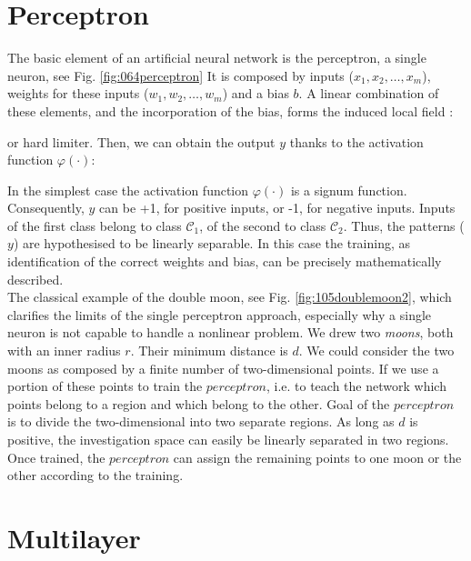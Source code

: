 \section{Perceptron}
\label{sec:perceptron}

The basic element of an artificial neural network is the perceptron, a single
neuron, see Fig.
\ref{fig:064perceptron}
It is composed by inputs ($x_1, x_2, \ldots, x_m$), weights for these inputs
($w_1, w_2, \ldots, w_m$) and a bias $b$.
A linear combination of these elements, and the incorporation of the bias, 
forms the induced local field \cite{RefWorks:158}: 

or hard limiter.
Then, we can obtain the output $y$ thanks to the activation function
$\varphi(\cdot)$:


In the simplest case the activation function $\varphi(\cdot)$ is a signum function.
Consequently, $y$ can be +1, for positive inputs, or -1, for negative inputs. Inputs of the first class
belong to class $\mathscr{C}_1$, of the second to class $\mathscr{C}_2$.
Thus, the patterns ($y$) are hypothesised to be linearly separable.
In this case the training, as identification of the correct weights and bias,
can be precisely mathematically described. \\

The classical example of the double moon, see Fig. \ref{fig:105doublemoon2},
which clarifies the limits of the single perceptron approach, especially 
why a single neuron is not capable to handle a
nonlinear problem.
We drew two \textit{moons}, both with an inner radius $r$. 
Their minimum distance is $d$.
We could consider the two moons as composed by a finite number of
two-dimensional points.
If we use a portion of these points to train the $perceptron$, i.e. 
to teach the network which points belong to a region and which belong to the
other.
Goal of the $perceptron$ is to divide the two-dimensional
into two separate regions.
As long as $d$ is positive, the investigation space
can easily be linearly separated in two regions.
Once trained, the $perceptron$ can assign the remaining points 
to one moon or the other according to the training.

\section{Multilayer}
\label{sec:multilayer}






